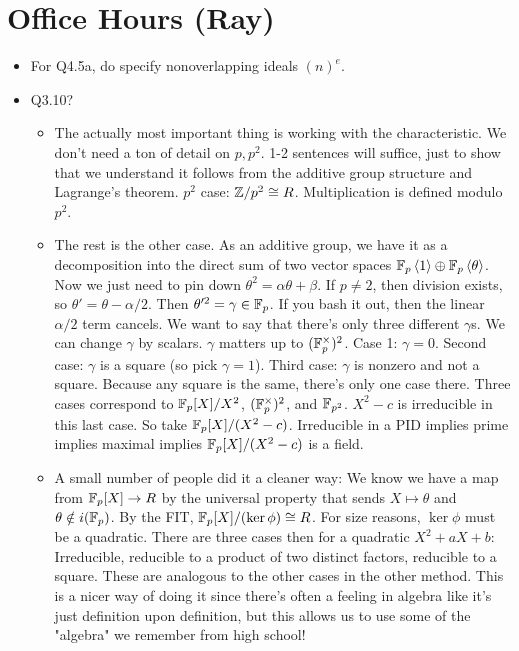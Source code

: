 \documentclass[../notes.tex]{subfiles}
\begin{document}
\section{Office Hours (Ray)}
\begin{itemize}
    \item For Q4.5a, do specify nonoverlapping ideals $(n)^e$.
    \item Q3.10?
    \begin{itemize}
        \item The actually most important thing is working with the characteristic. We don't need a ton of detail on $p,p^2$. 1-2 sentences will suffice, just to show that we understand it follows from the additive group structure and Lagrange's theorem. $p^2$ case: $\mathbb{Z}/p^2\cong R$. Multiplication is defined modulo $p^2$.
        \item The rest is the other case. As an additive group, we have it as a decomposition into the direct sum of two vector spaces $\mathbb{F}_p\left\langle{1}\right\rangle\oplus\mathbb{F}_p\left\langle{\theta}\right\rangle$. Now we just need to pin down $\theta^2=\alpha\theta+\beta$. If $p\neq 2$, then division exists, so $\theta'=\theta-\alpha/2$. Then $\theta'^2=\gamma\in\mathbb{F}_p$. If you bash it out, then the linear $\alpha/2$ term cancels. We want to say that there's only three different $\gamma$s. We can change $\gamma$ by scalars. $\gamma$ matters up to $(\mathbb{F}_p^\times)^2$. Case 1: $\gamma=0$. Second case: $\gamma$ is a square (so pick $\gamma=1$). Third case: $\gamma$ is nonzero and not a square. Because any square is the same, there's only one case there. Three cases correspond to $\mathbb{F}_p[X]/X^2$, $(\mathbb{F}_p^\times)^2$, and $\mathbb{F}_{p^2}$. $X^2-c$ is irreducible in this last case. So take $\mathbb{F}_p[X]/(X^2-c)$. Irreducible in a PID implies prime implies maximal implies $\mathbb{F}_p[X]/(X^2-c)$ is a field.
        \item A small number of people did it a cleaner way: We know we have a map from $\mathbb{F}_p[X]\to R$ by the universal property that sends $X\mapsto\theta$ and $\theta\notin i(\mathbb{F}_p)$. By the FIT, $\mathbb{F}_p[X]/(\ker\phi)\cong R$. For size reasons, $\ker\phi$ must be a quadratic. There are three cases then for a quadratic $X^2+aX+b$: Irreducible, reducible to a product of two distinct factors, reducible to a square. These are analogous to the other cases in the other method. This is a nicer way of doing it since there's often a feeling in algebra like it's just definition upon definition, but this allows us to use some of the "algebra" we remember from high school!
    \end{itemize}
\end{itemize}
\end{document}
